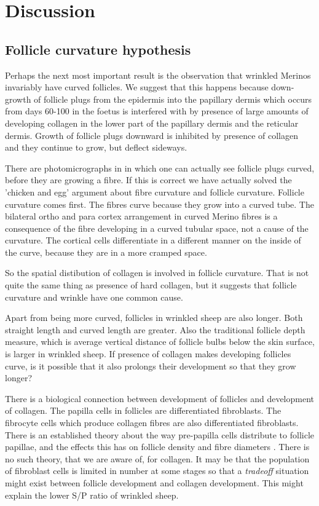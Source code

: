 \documentclass{article}
\begin{document}
\section{Discussion}
 
\subsection{Follicle curvature hypothesis}
Perhaps the next most important result is the observation that wrinkled Merinos invariably have curved follicles. We suggest that this happens because down-growth of follicle plugs from the epidermis into the papillary dermis which occurs from days 60-100 in the foetus is interfered with by presence of large amounts of developing collagen in the lower part of the papillary dermis and the reticular dermis. Growth of follicle plugs downward is inhibited by presence of collagen and they continue to grow, but deflect sideways.

There are photomicrographs in \cite{hardy-1956} in which one can actually see follicle plugs curved, before they are growing a fibre. If this is correct we have actually solved the 'chicken and egg' argument about fibre curvature and follicle curvature. Follicle curvature comes first. The fibres curve because they grow into a curved tube. The bilateral ortho and para cortex arrangement in curved Merino fibres is a consequence of the fibre developing in a curved tubular space, not a cause of the curvature. The cortical cells differentiate in a different manner on the inside of the curve, because they are in a more cramped space.

So the spatial distibution of collagen is involved in follicle curvature. That is not quite the same thing as presence of hard collagen, but it suggests that follicle curvature and wrinkle have one common cause.

Apart from being more curved, follicles in wrinkled sheep are also longer. Both straight length and curved length are greater. Also the traditional follicle depth measure, which is average vertical distance of follicle bulbs below the skin surface, is larger in wrinkled sheep.  If presence of collagen makes developing follicles curve, is it possible that it also prolongs their development so that they grow longer? 

There is a biological connection between development of follicles and development of collagen. The papilla cells in follicles are differentiated fibroblasts. The fibrocyte cells which produce collagen fibres are also differentiated fibroblasts.  There is an established theory about the way pre-papilla cells distribute to follicle papillae, and the effects this has on follicle density and fibre diameters \cite{moore-1989,moore-1996}. There is no such theory, that we are aware of, for collagen. It may be that the population of fibroblast cells is limited in number at some stages so that a {\em tradeoff} situation might exist between follicle development and collagen development. This might explain the lower S/P ratio of wrinkled sheep.
\end{document}
